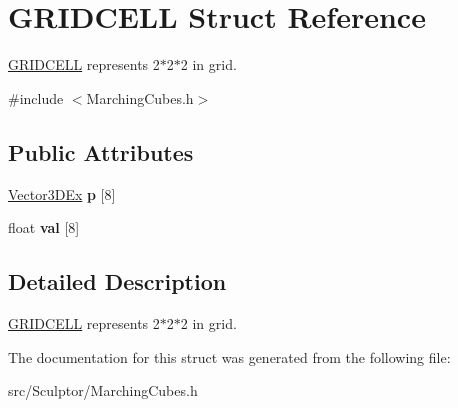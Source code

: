 \hypertarget{struct_g_r_i_d_c_e_l_l}{
\section{\-G\-R\-I\-D\-C\-E\-L\-L \-Struct \-Reference}
\label{struct_g_r_i_d_c_e_l_l}
}


\hyperlink{struct_g_r_i_d_c_e_l_l}{\-G\-R\-I\-D\-C\-E\-L\-L} represents 2$\ast$2$\ast$2 in grid.  




{\ttfamily \#include $<$\-Marching\-Cubes.\-h$>$}

\subsection*{\-Public \-Attributes}
\begin{DoxyCompactItemize}
\item 
\hypertarget{struct_g_r_i_d_c_e_l_l_a20697089e4d4363a546cfa3d02ed5da4}{
\hyperlink{class_vector3_d_ex}{\-Vector3\-D\-Ex} {\bfseries p} \mbox{[}8\mbox{]}}
\label{struct_g_r_i_d_c_e_l_l_a20697089e4d4363a546cfa3d02ed5da4}

\item 
\hypertarget{struct_g_r_i_d_c_e_l_l_a9a22092f622d467d83b7f4f337a340f5}{
float {\bfseries val} \mbox{[}8\mbox{]}}
\label{struct_g_r_i_d_c_e_l_l_a9a22092f622d467d83b7f4f337a340f5}

\end{DoxyCompactItemize}


\subsection{\-Detailed \-Description}
\hyperlink{struct_g_r_i_d_c_e_l_l}{\-G\-R\-I\-D\-C\-E\-L\-L} represents 2$\ast$2$\ast$2 in grid. 

\-The documentation for this struct was generated from the following file\-:\begin{DoxyCompactItemize}
\item 
src/\-Sculptor/\-Marching\-Cubes.\-h\end{DoxyCompactItemize}
